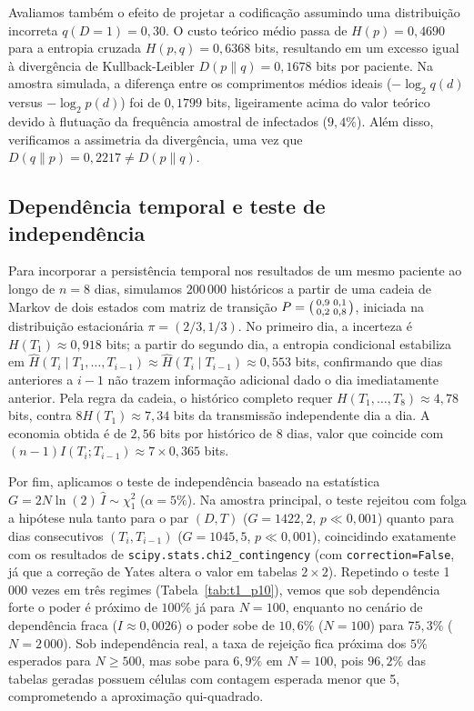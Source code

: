 \documentclass[11pt,a4paper]{article}
\begin{document}
Avaliamos também o efeito de projetar a codificação assumindo uma distribuição incorreta $q(D=1)=0{,}30$. O custo teórico médio passa de $H(p)=0{,}4690$ para a entropia cruzada $H(p,q)=0{,}6368$ bits, resultando em um excesso igual à divergência de Kullback-Leibler $D(p\|q)=0{,}1678$ bits por paciente. Na amostra simulada, a diferença entre os comprimentos médios ideais ($-\log_2 q(d)$ versus $-\log_2 p(d)$) foi de $0{,}1799$ bits, ligeiramente acima do valor teórico devido à flutuação da frequência amostral de infectados ($9{,}4\%$). Além disso, verificamos a assimetria da divergência, uma vez que $D(q\|p)=0{,}2217 \neq D(p\|q)$.

\subsection{Dependência temporal e teste de independência}
Para incorporar a persistência temporal nos resultados de um mesmo paciente ao longo de $n=8$ dias, simulamos $200\,000$ históricos a partir de uma cadeia de Markov de dois estados com matriz de transição $P=\begin{psmallmatrix}0{,}9&0{,}1\\0{,}2&0{,}8\end{psmallmatrix}$, iniciada na distribuição estacionária $\pi=(2/3, 1/3)$. No primeiro dia, a incerteza é $H(T_1)\approx 0{,}918$ bits; a partir do segundo dia, a entropia condicional estabiliza em $\hat H(T_i\mid T_1,\dots,T_{i-1})\approx \hat H(T_i\mid T_{i-1})\approx 0{,}553$ bits, confirmando que dias anteriores a $i-1$ não trazem informação adicional dado o dia imediatamente anterior. Pela regra da cadeia, o histórico completo requer $H(T_1,\dots,T_8)\approx 4{,}78$ bits, contra $8H(T_1)\approx 7{,}34$ bits da transmissão independente dia a dia. A economia obtida é de $2{,}56$ bits por histórico de 8 dias, valor que coincide com $(n-1)I(T_i;T_{i-1})\approx 7\times 0{,}365$ bits.

Por fim, aplicamos o teste de independência baseado na estatística $G = 2N\ln(2)\,\hat I \sim \chi^2_1$ ($\alpha=5\%$). Na amostra principal, o teste rejeitou com folga a hipótese nula tanto para o par $(D,T)$ ($G=1422{,}2$, $p\ll 0{,}001$) quanto para dias consecutivos $(T_i,T_{i-1})$ ($G=1045{,}5$, $p\ll 0{,}001$), coincidindo exatamente com os resultados de \texttt{scipy.stats.chi2\_contingency} (com \texttt{correction=False}, já que a correção de Yates altera o valor em tabelas $2\times2$). Repetindo o teste 1\,000 vezes em três regimes (Tabela~\ref{tab:t1_p10}), vemos que sob dependência forte o poder é próximo de $100\%$ já para $N=100$, enquanto no cenário de dependência fraca ($I\approx 0{,}0026$) o poder sobe de $10{,}6\%$ ($N=100$) para $75{,}3\%$ ($N=2\,000$). Sob independência real, a taxa de rejeição fica próxima dos $5\%$ esperados para $N\ge 500$, mas sobe para $6{,}9\%$ em $N=100$, pois $96{,}2\%$ das tabelas geradas possuem células com contagem esperada menor que 5, comprometendo a aproximação qui-quadrado.
\end{document}

